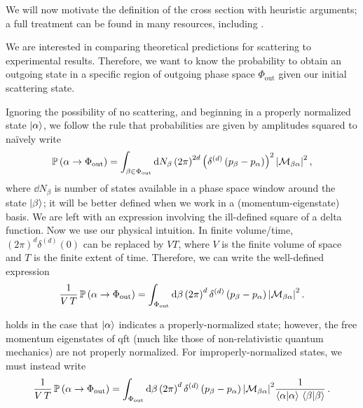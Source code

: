 We will now motivate the definition of the cross section with heuristic arguments;
%
a full treatment can be found in many resources, including .

We are interested in comparing theoretical predictions for scattering to experimental results.
%
Therefore, we want to know the probability to obtain an outgoing state in a specific region of outgoing phase space \(\Phi_\text{out}\) given our initial scattering state.

Ignoring the possibility of no scattering, and beginning in a properly normalized state \(\ket{\alpha}\), we follow the rule that probabilities are given by amplitudes squared to na\"ively write
\begin{align}
    \mathbb{P}\left(\alpha \to \Phi_\text{out}\right)
    =
    \int_{\beta \in \Phi_\text{out}}
    \dd N_\beta
    \left(2 \pi\right)^{2d}
    \left(\delta^{(d)}\left(p_\beta - p_\alpha\right)\right)^2
    \abs{\mathcal{M}_{\beta\alpha}}^2
    \,,
\end{align}
where \(\dd N_\beta\) is  number of states available in a phase space window around the state \(\ket{\beta}\);
%
it will be better defined when we work in a (momentum-eigenstate) basis.
%
We are left with an expression involving the ill-defined square of a delta function.
%
Now we use our physical intuition.
%
In finite volume/time, \((2\pi)^d \delta^{(d)}(0)\) can be replaced by \(V T\), where \(V\) is the finite volume of space and \(T\) is the finite extent of time.
%
Therefore, we can write the well-defined expression
\begin{align}
    \label{eq:probability-propertly-normalized}
    \frac{1}{V\,T}
    \,
    \mathbb{P}\le(\alpha \to \Phi_\text{out}\ri)
    =
    \int_{\Phi_\text{out}}
    \dd \beta
    \le(2 \pi\ri)^{d}
    \delta^{(d)}\le(p_\beta - p_\alpha\ri)
    \abs{\mathcal{M}_{\beta\alpha}}^2
    \,.
\end{align}

 holds in the case that \(\ket{\alpha}\) indicates a properly-normalized state;
%
however, the free momentum eigenstates of \gls{qft} (much like those of non-relativistic quantum mechanics) are not properly normalized.
%
For improperly-normalized states, we must instead write
\begin{align}
    \label{eq:probability-not-normalized}
    \frac{1}{V\,T}
    \,
    \mathbb{P}\le(\alpha \to \Phi_\text{out}\ri)
    =
    \int_{\Phi_\text{out}}
    \dd \beta
    \le(2 \pi\ri)^{d}
    \delta^{(d)}\le(p_\beta - p_\alpha\ri)
    \abs{\mathcal{M}_{\beta\alpha}}^2
    \frac{1}{\braket{\alpha}{\alpha}\,\braket{\beta}{\beta}}
    \,.
\end{align}

